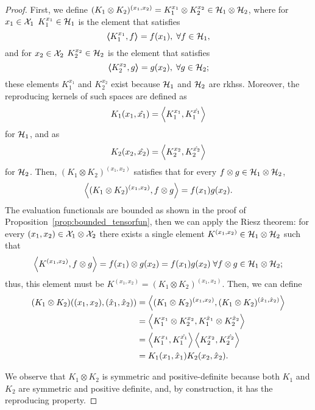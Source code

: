 \begin{proof}
    First, we define $(K_1 \otimes K_2)^{(x_1 , x_2)} =  K_1^{x_1} \otimes K_2^{x_2}  \in \mathcal{H}_1 \otimes \mathcal{H}_2$,
    where for $x_1 \in \mathcal{X}_1$  $K_1^{x_1} \in \mathcal{H}_1$ is the element that satisfies
    \begin{equation}\nonumber
        \bm{\left\langle} K_1^{x_1}, f \bm{\right\rangle} = f(x_1) , \; \forall f \in \mathcal{H}_1 ,
    \end{equation}
    and for $x_2 \in \mathcal{X}_2$  $K_2^{x_2} \in \mathcal{H}_2$ is the element that satisfies
    \begin{equation}\nonumber
        \bm{\left\langle} K_2^{x_2}, g \bm{\right\rangle} = g(x_2) , \; \forall g \in \mathcal{H}_2  ;
    \end{equation}
    these elements $K_1^{x_1}$ and $K_2^{x_2}$ exist because $\mathcal{H}_1$ and $\mathcal{H}_2$ are \acrshort{rkhss}.
    Moreover, the reproducing kernels of such spaces are defined as
    $$ K_1(x_1, \hat{x_1}) = \bm{\left\langle} K_1^{x_1}, K_1^{\hat{x_1}} \bm{\right\rangle} $$
    for $\mathcal{H}_1$, and as 
    $$ K_2(x_2, \hat{x_2}) = \bm{\left\langle} K_2^{x_2}, K_2^{\hat{x_2}} \bm{\right\rangle} $$
    for $\mathcal{H}_2$.
    Then, $(K_1 \otimes K_2)^{(x_1 , x_2)}$ satisfies that for every $f \otimes g \in \mathcal{H}_1 \otimes \mathcal{H}_2$,
    \begin{equation}\nonumber
        \bm{\left\langle} (K_1 \otimes K_2)^{(x_1 , x_2)}, f \otimes g \bm{\right\rangle} = f(x_1) g(x_2) .
    \end{equation}
    The evaluation functionals are bounded as shown in the proof of Proposition~\ref{prop:bounded_tensorfun}, then we can apply the Riesz theorem: for every $(x_1 , x_2) \in \mathcal{X}_1 \otimes \mathcal{X}_2$ there exists a single element $K^{(x_1 , x_2)} \in \mathcal{H}_1 \otimes \mathcal{H}_2$ such that
    \begin{equation}
        \nonumber
        \bm{\left\langle} K^{(x_1 , x_2)}, f \otimes g \bm{\right\rangle} = f(x_1) \otimes g(x_2) = f(x_1) g(x_2)\;  \forall f \otimes g \in \mathcal{H}_1 \otimes \mathcal{H}_2 ;
    \end{equation}
    thus, this element must be $K^{(x_1 , x_2)} = (K_1 \otimes K_2)^{(x_1 , x_2)}$.
    Then, we can define
    \begin{align*}
        (K_1 \otimes K_2)((x_1 , x_2), (\hat{x}_1 , \hat{x}_2)) & = \bm{\left\langle} (K_1 \otimes K_2)^{(x_1 , x_2)}, (K_1 \otimes K_2)^{(\hat{x}_1 , \hat{x}_2)} \bm{\right\rangle} \\
                                                                & = \bm{\left\langle} K_1^{x_1} \otimes K_2^{x_2}, K_1^{\hat{x}_1} \otimes K_2^{\hat{x}_2} \bm{\right\rangle}         \\
                                                                & = \bm{\left\langle} K_1^{x_1}, K_1^{\hat{x_1}} \bm{\right\rangle} \bm{\left\langle} K_2^{x_2}, K_2^{\hat{x_2}} \bm{\right\rangle}                 \\
                                                                & = K_1(x_1, \hat{x}_1) K_2(x_2, \hat{x}_2) .
    \end{align*}


    We observe that $K_1 \otimes K_2$ is symmetric and positive-definite because both $K_1$ and $K_2$ are symmetric and positive definite, %
    and, by construction, it has the reproducing property.
\end{proof}
